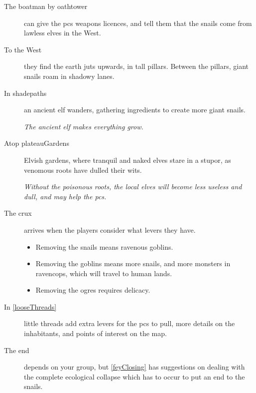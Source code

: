 \begin{multicols}{2}
\begin{description}
  \item[The boatman by \gls{oathtower}]
  can give the \glspl{pc} weapons licences, and tell them that the snails come from lawless elves in the West.

  \item[To the West]
  they find the earth juts upwards, in tall pillars.
  Between the pillars, giant snails roam in shadowy lanes.

  \item[In \gls{shadepaths}]
  an ancient elf wanders, gathering \glspl{ingredient} to create more giant snails.

  \textit{The ancient elf makes everything grow.}

  \item[Atop \gls{plateauGardens}]
  Elvish gardens, where tranquil and naked elves stare in a stupor, as venomous roots have dulled their wits.

  \textit{Without the poisonous roots, the local elves will become less useless and dull, and may help the \glspl{pc}.}

  \item[The crux]
  arrives when the players consider what levers they have.
  \begin{itemize}
    \item
    Removing the snails means ravenous goblins.
    \item
    Removing the goblins means more snails, and more monsters in \gls{ravencops}, which will travel to human lands.
    \item
    Removing the \glspl{ogre} requires delicacy.
  \end{itemize}
  \item[In \autoref{looseThreads}]
  little \glspl{thread} add extra levers for the \glspl{pc} to pull, more details on the inhabitants, and points of interest on the map.

  \item[The end]
  depends on your group, but \autoref{feyClosing} has suggestions on dealing with the complete ecological collapse which has to occur to put an end to the snails.
\end{description}


\end{multicols}
